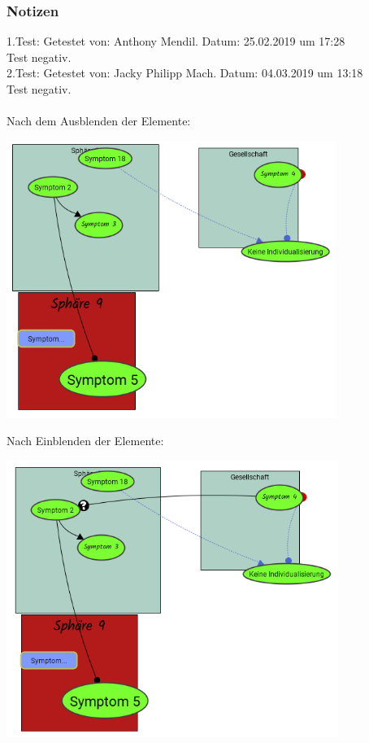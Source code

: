 \documentclass[enabledeprecatedfontcommands]{scrartcl}
\begin{document}
\subsubsection{Notizen}
1.Test: Getestet von: Anthony Mendil. Datum: 25.02.2019 um 17:28 \\
Test negativ. \\
2.Test: Getestet von: Jacky Philipp Mach. Datum: 04.03.2019 um 13:18 \\
Test negativ.\\\\
Nach dem Ausblenden der Elemente:
\begin{center}
\includegraphics[height=9.0cm]{3_55.PNG}
\end{center}
Nach Einblenden der Elemente:
\begin{center}
\includegraphics[height=9.0cm]{3_55eingeblendet.PNG}
\end{center}
\end{document}
